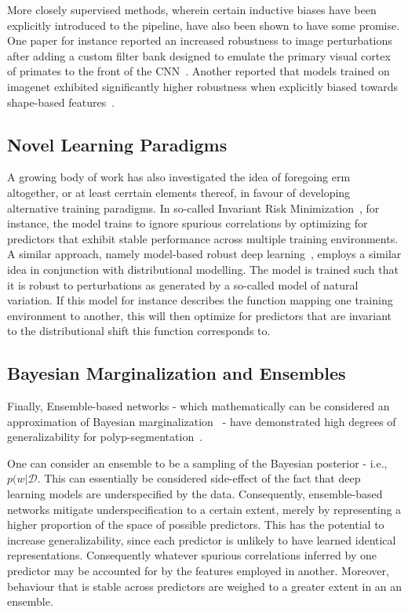 More closely supervised methods, wherein certain inductive biases have been explicitly introduced to the pipeline, have also been shown to have some promise. One paper for instance reported an increased robustness to image perturbations after adding a custom filter bank designed to emulate the primary visual cortex of primates to the front of the CNN~\cite{visual_cortex}. Another reported that models trained on imagenet exhibited significantly higher robustness when explicitly biased towards shape-based features~\cite{texturebias}. 

\subsection{Novel Learning Paradigms}
A growing body of work has also investigated the idea of foregoing \gls{erm} altogether, or at least cerrtain elements thereof, in favour of developing alternative training paradigms. In so-called Invariant Risk Minimization~\cite{IRM}, for instance, the model trains to ignore spurious correlations by optimizing for predictors that exhibit stable performance across multiple training environments. A similar approach, namely model-based robust deep learning~\cite{modelbased}, employs a similar idea in conjunction with distributional modelling. The model is trained such that it is robust to perturbations as generated by a so-called model of natural variation. If this model for instance describes the function mapping one training environment to another, this will then optimize for predictors that are invariant to the distributional shift this function corresponds to. 

\subsection{Bayesian Marginalization and Ensembles}\label{background:ensembles}
Finally, Ensemble-based networks - which mathematically can be considered an approximation of Bayesian marginalization~\cite{bayesian_case,bayesian_generalization} - have demonstrated high degrees of generalizability for polyp-segmentation~\cite{divergentnets,endoensemble}. 

One can consider an ensemble to be a sampling of the Bayesian posterior - i.e., \(p(w | \mathcal{D}\). This can essentially be considered side-effect of the fact that deep learning models are underspecified by the data. Consequently, ensemble-based networks mitigate underspecification to a certain extent, merely by representing a higher proportion of the space of possible predictors. This has the potential to increase generalizability, since each predictor is unlikely to have learned identical representations. Consequently whatever spurious correlations inferred by one predictor may be accounted for by the features employed in another. Moreover, behaviour that is stable across predictors are weighed to a greater extent in an an ensemble. 

